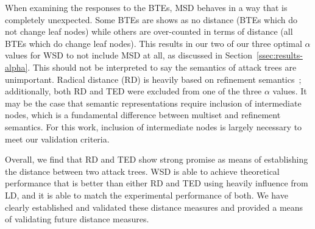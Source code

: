 When examining the responses to the BTEs, MSD behaves in a way that is completely unexpected. Some BTEs are shows as no distance (BTEs which do not change leaf nodes) while others are over-counted in terms of distance (all BTEs which do change leaf nodes). This results in our two of our three optimal $\alpha$ values for WSD to not include MSD at all, as discussed in Section~\ref{ssec:results-alpha}. This should not be interpreted to say the semantics of attack trees are unimportant. Radical distance (RD) is heavily based on refinement semantics~\cite{gadyatskayaRefinementAwareGenerationAttack2017}; additionally, both RD and TED were excluded from one of the three $\alpha$ values. It may be the case that semantic representations require inclusion of intermediate nodes, which is a fundamental difference between multiset and refinement semantics. For this work, inclusion of intermediate nodes is largely necessary to meet our validation criteria.






Overall, we find that RD and TED show strong promise as means of establishing the distance between two attack trees. WSD is able to achieve theoretical performance that is better than either RD and TED using heavily influence from LD, and it is able to match the experimental performance of both. We have clearly established and validated these distance measures and provided a means of validating future distance measures.


















































































